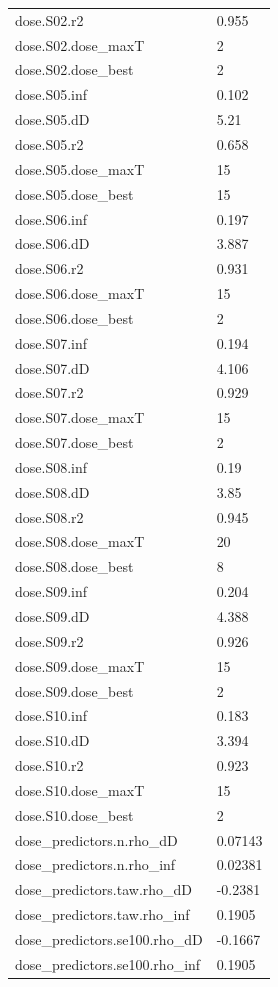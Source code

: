 {\begin{longtable}{p{}p{}}
{}dose.S02.r2 & 0.955\\
{}dose.S02.dose\_maxT & 2\\
{}dose.S02.dose\_best & 2\\
{}dose.S05.inf & 0.102\\
{}dose.S05.dD & 5.21\\
{}dose.S05.r2 & 0.658\\
{}dose.S05.dose\_maxT & 15\\
{}dose.S05.dose\_best & 15\\
{}dose.S06.inf & 0.197\\
{}dose.S06.dD & 3.887\\
{}dose.S06.r2 & 0.931\\
{}dose.S06.dose\_maxT & 15\\
{}dose.S06.dose\_best & 2\\
{}dose.S07.inf & 0.194\\
{}dose.S07.dD & 4.106\\
{}dose.S07.r2 & 0.929\\
{}dose.S07.dose\_maxT & 15\\
{}dose.S07.dose\_best & 2\\
{}dose.S08.inf & 0.19\\
{}dose.S08.dD & 3.85\\
{}dose.S08.r2 & 0.945\\
{}dose.S08.dose\_maxT & 20\\
{}dose.S08.dose\_best & 8\\
{}dose.S09.inf & 0.204\\
{}dose.S09.dD & 4.388\\
{}dose.S09.r2 & 0.926\\
{}dose.S09.dose\_maxT & 15\\
{}dose.S09.dose\_best & 2\\
{}dose.S10.inf & 0.183\\
{}dose.S10.dD & 3.394\\
{}dose.S10.r2 & 0.923\\
{}dose.S10.dose\_maxT & 15\\
{}dose.S10.dose\_best & 2\\
{}dose\_predictors.n.rho\_dD & 0.07143\\
{}dose\_predictors.n.rho\_inf & 0.02381\\
{}dose\_predictors.taw.rho\_dD & -0.2381\\
{}dose\_predictors.taw.rho\_inf & 0.1905\\
{}dose\_predictors.se100.rho\_dD & -0.1667\\
{}dose\_predictors.se100.rho\_inf & 0.1905\\

\end{longtable}}

